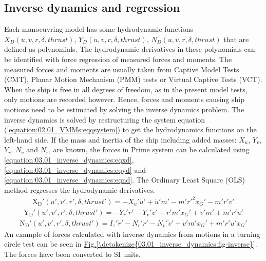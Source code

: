 \subsection{Inverse dynamics and regression}
\label{\detokenize{03.01_inverse_dynamics:inverse-dynamics-and-regression}}\label{\detokenize{03.01_inverse_dynamics::doc}}
\sphinxAtStartPar
Each manoeuvring model has some hydrodynamic functions \(X_D(u,v,r,\delta,thrust)\), \(Y_D(u,v,r,\delta,thrust)\), \(N_D(u,v,r,\delta,thrust)\) that are defined as polynomials. The hydrodynamic derivatives in these polynomials can be identified with force regression of measured forces and moments. The measured forces and moments are usually taken from Captive Model Tests (CMT), Planar Motion Mechanism (PMM) tests or Virtual Captive Tests (VCT). When the ship is free in all degrees of freedom, as in the present model tests, only
motions are recorded however. Hence, forces and moments causing ship motions need to be estimated by
solving the inverse dynamics problem.
The inverse dynamics is solved by restructuring the system equation (\autoref{equation:02.01_VMMs:eqqsystem}) to get the hydrodynamics functions on the left-hand side. If the mass and inertia of the ship including added masses: \(X_{\dot{u}}\), \(Y_{\dot{v}}\), \(Y_{\dot{r}}\), \(N_{\dot{v}}\) and \(N_{\dot{r}}\), are known, the forces in Prime system can be calculated using \autoref{equation:03.01_inverse_dynamics:eqxd}, \autoref{equation:03.01_inverse_dynamics:eqyd} and \autoref{equation:03.01_inverse_dynamics:eqnd}.
The Ordinary Least Square (OLS) method regresses the hydrodynamic derivatives. 
\begin{equation}\label{equation:03.01_inverse_dynamics:eqxd}
\begin{split}\displaystyle \operatorname{X_{D}'}{\left(u',v',r',\delta,thrust' \right)} = - X_{\dot{u}}' \dot{u}' + \dot{u}' m' - m' r'^{2} x_{G}' - m' r' v'\end{split}
\end{equation}\begin{equation}\label{equation:03.01_inverse_dynamics:eqyd}
\begin{split}\displaystyle \operatorname{Y_{D}'}{\left(u',v',r',\delta,thrust' \right)} = - Y_{\dot{r}}' \dot{r}' - Y_{\dot{v}}' \dot{v}' + \dot{r}' m' x_{G}' + \dot{v}' m' + m' r' u'\end{split}
\end{equation}\begin{equation}\label{equation:03.01_inverse_dynamics:eqnd}
\begin{split}\displaystyle \operatorname{N_{D}'}{\left(u',v',r',\delta,thrust' \right)} = I_{z}' \dot{r}' - N_{\dot{r}}' \dot{r}' - N_{\dot{v}}' \dot{v}' + \dot{v}' m' x_{G}' + m' r' u' x_{G}'\end{split}
\end{equation}
\sphinxAtStartPar
An example of forces calculated with inverse dynamics from motions in a turning circle test can be seen in \hyperref[\detokenize{03.01_inverse_dynamics:fig-inverse}]{Fig.\@ \ref{\detokenize{03.01_inverse_dynamics:fig-inverse}}}. The forces have been converted to SI units.

